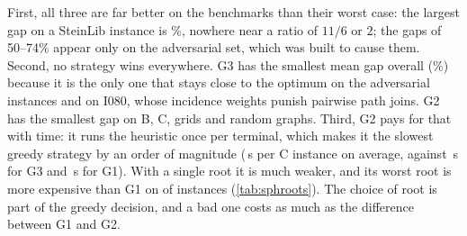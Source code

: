 

\noindent First, all three are far better on the benchmarks than their worst case: the largest gap on a SteinLib instance is
\%, nowhere near a ratio of \(11/6\) or \(2\); the gaps of 50--74\% appear only on the adversarial set, which was built to
cause them. Second, no strategy wins everywhere. G3 has the smallest mean gap overall (\%) because it is the only one that
stays close to the optimum on the adversarial instances and on I080, whose incidence weights punish pairwise path joins. G2 has the
smallest gap on B, C, grids and random graphs. Third, G2 pays for that with time: it runs the heuristic once per terminal, which makes it
the slowest greedy strategy by an order of magnitude (\,s per C instance on average, against \,s for G3 and \,s for G1). With a single root
it is much weaker, and its worst root is more expensive than G1 on  of  instances
(\cref{tab:sphroots}). The choice of root is part of the greedy decision, and a bad one costs as much as the difference between G1 and G2.


